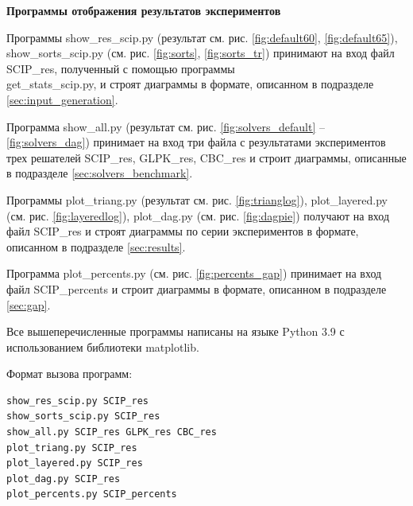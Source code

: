 \textbf{Программы отображения результатов экспериментов}

Программы show\_res\_scip.py (результат см. рис. \ref{fig:default60}, \ref{fig:default65}), show\_sorts\_scip.py (см. рис. \ref{fig:sorts}, \ref{fig:sorts_tr}) принимают на вход файл SCIP\_res, полученный с помощью программы \\get\_stats\_scip.py, и строят диаграммы в формате, описанном в подразделе \ref{sec:input_generation}. 

Программа show\_all.py (результат см. рис. \ref{fig:solvers_default} -- \ref{fig:solvers_dag}) принимает на вход три файла с результатами экспериментов трех решателей SCIP\_res, GLPK\_res, CBC\_res и строит диаграммы, описанные в подразделе \ref{sec:solvers_benchmark}.

Программы plot\_triang.py (результат см. рис. \ref{fig:trianglog}), plot\_layered.py (см. рис. \ref{fig:layeredlog}), plot\_dag.py (см. рис. \ref{fig:dagpie}) получают на вход файл SCIP\_res и строят диаграммы по серии экспериментов в формате, описанном в подразделе \ref{sec:results}.

Программа plot\_percents.py (см. рис. \ref{fig:percents_gap}) принимает на вход файл SCIP\_percents и строит диаграммы в формате, описанном в подразделе \ref{sec:gap}. 

Все вышеперечисленные программы написаны на языке Python 3.9 с использованием библиотеки matplotlib.

Формат вызова программ:
\begin{verbatim}
show_res_scip.py SCIP_res
show_sorts_scip.py SCIP_res
show_all.py SCIP_res GLPK_res CBC_res
plot_triang.py SCIP_res
plot_layered.py SCIP_res
plot_dag.py SCIP_res
plot_percents.py SCIP_percents
\end{verbatim}